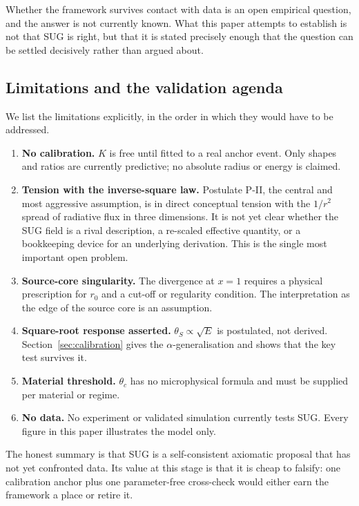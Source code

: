 \documentclass[11pt,a4paper]{article}
\newcommand{\thetaS}{\theta_{S}}
\begin{document}
Whether the framework survives contact with data is an open empirical
question, and the answer is not currently known. What this paper attempts to
establish is not that SUG is right, but that it is stated precisely enough
that the question can be settled decisively rather than argued about.

\subsection{Limitations and the validation agenda}
\label{sec:limitations}

We list the limitations explicitly, in the order in which they would have to
be addressed.

\begin{enumerate}
  \item \textbf{No calibration.} $K$ is free until fitted to a real anchor
        event. Only shapes and ratios are currently predictive; no absolute
        radius or energy is claimed.
  \item \textbf{Tension with the inverse-square law.} Postulate P-II, the
        central and most aggressive assumption, is in direct conceptual
        tension with the $1/r^{2}$ spread of radiative flux in three
        dimensions. It is not yet clear whether the SUG field is a rival
        description, a re-scaled effective quantity, or a bookkeeping
        device for an underlying derivation. This is the single most
        important open problem.
  \item \textbf{Source-core singularity.} The divergence at $x=1$ requires a
        physical prescription for $r_0$ and a cut-off or regularity
        condition. The interpretation as the edge of the source core is an
        assumption.
  \item \textbf{Square-root response asserted.} $\thetaS\propto\sqrt{E}$ is
        postulated, not derived. Section~\ref{sec:calibration} gives the
        $\alpha$-generalisation and shows that the key test survives it.
  \item \textbf{Material threshold.} $\theta_c$ has no microphysical
        formula and must be supplied per material or regime.
  \item \textbf{No data.} No experiment or validated simulation currently
        tests SUG. Every figure in this paper illustrates the model only.
\end{enumerate}

The honest summary is that SUG is a self-consistent axiomatic proposal that
has not yet confronted data. Its value at this stage is that it is cheap to
falsify: one calibration anchor plus one parameter-free cross-check would
either earn the framework a place or retire it.
\end{document}
